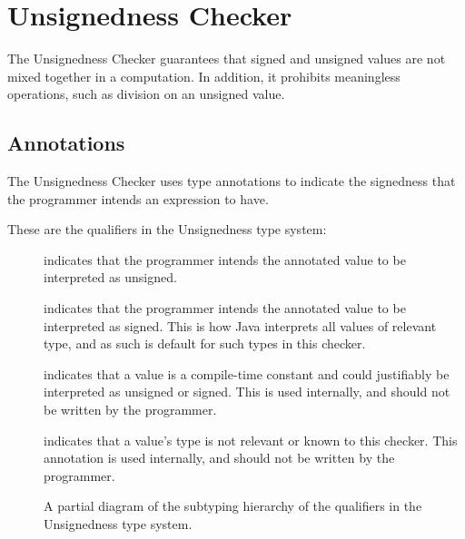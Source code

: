 \htmlhr
\chapter{Unsignedness Checker\label{unsignedness-checker}}

The Unsignedness Checker guarantees that signed and unsigned values are not mixed 
together in a computation. In addition, it prohibits meaningless operations, such 
as division on an unsigned value.

\section{Annotations\label{unsignedness-checker-annotations}}

The Unsignedness Checker uses type annotations to indicate the signedness that the programmer intends an expression to have.

These are the qualifiers in the Unsignedness type system:

\begin{description}

\item[]
    indicates that the programmer intends the annotated value to be interpreted as unsigned.

\item[]
    indicates that the programmer intends the annotated value to be interpreted
    as signed. This is how Java interprets all values of relevant type, and as
    such is default for such types in this checker.

\item[]
    indicates that a value is a compile-time constant and could justifiably be
    interpreted as unsigned or signed. This is used internally, and should not 
    be written by the programmer.

\item[]
    indicates that a value's type is not relevant or known to this checker. 
    This annotation is used internally, and should not be
    written by the programmer.

\end{description}

\begin{figure}
\caption{A partial diagram of the subtyping hierarchy of the qualifiers in the 
Unsignedness type system.}
\label{fig-unsignedness-hierarchy}
\end{figure}

